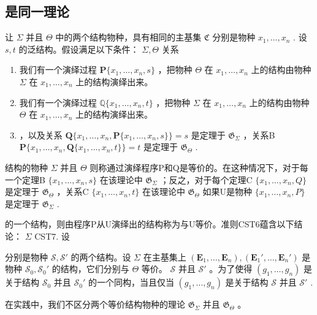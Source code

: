 \subsection{是同一理论}

让 \(\Sigma\) 并且 \(\Theta\) 中的两个结构物种，具有相同的主基集 \(\mathfrak{C}\) 分别是物种 \(x_{1},\ldots ,x_{n}\) . 设 \(s,t\) 的泛结构。假设满足以下条件： \(\Sigma,\Theta\) 关系

\begin{enumerate}
\def\labelenumi{(\arabic{enumi})}
\item
  我们有一个演绎过程 \(\mathbf{P}\{x_1, \ldots, x_n, s\}\) ，把物种 \(\Theta\) 在 \(x_1, \ldots, x_n\) 上的结构由物种 \(\Sigma\) 在 \(x_1, \ldots, x_n\) 上的结构演绎出来。
\item
  我们有一个演绎过程 \(\mathbb{Q}\{x_1, \ldots, x_n, t\}\) ，把物种 \(\Sigma\) 在 \(x_1, \ldots, x_n\) 上的结构由物种 \(\Theta\) 在 \(x_1, \ldots, x_n\) 上的结构演绎出来。
\item
  ，以及关系 \(\mathbf{Q}\{x_1, \ldots, x_n, \mathbf{P}\{x_1, \ldots, x_n, s\}\} = s\) 是定理于 \(\mathfrak{G}_{\Sigma}\) ，关系B \(\mathbf{P}\{x_1, \ldots, x_n, \mathbf{Q}\{x_1, \ldots, x_n, t\}\} = t\) 是定理于 \(\mathfrak{G}_{\Theta}\) .
\end{enumerate}

结构的物种 \(\Sigma\) 并且 \(\Theta\) 则称通过演绎程序P和Q是等价的。在这种情况下，对于每一个定理B \(\{x_1, \ldots, x_n, s\}\) 在该理论中 \(\mathfrak{G}_{\Sigma}\) ；反之，对于每个定理C \(\{x_1, \ldots, x_n, Q\}\) 是定理于 \(\mathfrak{G}_{\Theta}\) ，关系C \(\{x_1, \ldots, x_n, t\}\) 在该理论中 \(\mathfrak{G}_{\Theta}\) 如果U是物种 \(\{x_1, \ldots, x_n, P\}\) 是定理于 \(\mathfrak{G}_{\Sigma}\) .

的一个结构，则由程序P从U演绎出的结构称为与U等价。准则CST6蕴含以下结论： \(\Sigma\) CST7. 设

分别是物种 \(\mathcal{S},\mathcal{S}'\) 的两个结构。设 \(\Sigma\) 在主基集上 \((\mathbf{E}_1,\ldots ,\mathbf{E}_n),(\mathbf{E}_1',\ldots ,\mathbf{E}_n')\) 是物种 \(\mathcal{S}_0,\mathcal{S}_0'\) 的结构，它们分别与 \(\Theta\) 等价。 \(\mathcal{S}\) 并且 \(\mathcal{S}'\) 。为了使得 \((g_1,\dots,g_n)\) 是关于结构 \(\mathcal{S}_0\) 并且 \(\mathcal{S}_0'\) 的一个同构，当且仅当 \((g_1,\dots,g_n)\) 是关于结构 \(\mathcal{S}\) 并且 \(\mathcal{S}'\) .

在实践中，我们不区分两个等价结构物种的理论 \(\mathfrak{G}_{\Sigma}\) 并且 \(\mathfrak{G}_{\Theta}\) 。


